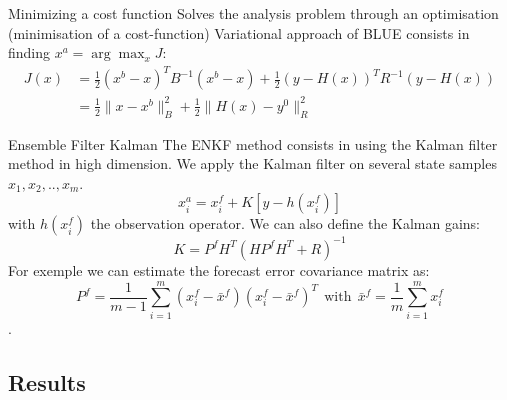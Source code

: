 \begin{frame}{Minimizing a cost function}
    Solves the analysis problem through an optimisation (minimisation of a cost-function)
    Variational approach of BLUE consists in finding $x^a=\arg\max_{x}J$:
    $$\begin{aligned}
        J(x)&=\frac{1}{2}(x^b-x)^TB^{-1}(x^b-x)+\frac{1}{2}(y-H(x))^TR^{-1}(y-H(x)) \\
        &=\frac{1}{2}\|x-x^b\|_B^2+\frac{1}{2}\|H(x)-y^0\|_R^2
    \end{aligned}$$
	\begin{minipage}{\linewidth}
		\centering
	\end{minipage}
\end{frame}
\begin{frame}{Ensemble Filter Kalman}
    The ENKF method consists in using the Kalman filter method in high dimension.
    \newline We apply the Kalman filter on several state samples $x_1,x_2,..,x_{m}$.
    $$x_i^a=x_i^f+K[y-h(x_i^f)]$$
    with $h(x_i^f)$ the observation operator.
    We can also define the Kalman gains: 
    $$K=P^f H^T(HP^f H^T+R)^{-1}$$
    For exemple we can estimate the
    forecast error covariance matrix as:
    $$P^f=\frac{1}{m-1}\sum_{i=1}^{m}(x_i^f-\bar{x}^f)(x_i^f-\bar{x}^f)^T~~\text{with}~~\bar{x}^f=\frac{1}{m}\sum_{i=1}^{m}x_i^f $$ .
\end{frame}
\subsection{Results}

